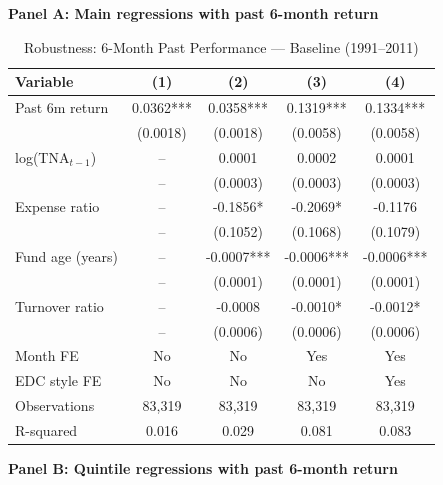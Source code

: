 \documentclass{article}
\begin{document}
\begin{table}[htbp]
\centering
\caption{Robustness: 6-Month Past Performance --- Baseline (1991--2011)}
\label{tab:robustness-6m}
\scriptsize
\begin{threeparttable}

\textbf{Panel A: Main regressions with past 6-month return}

\vspace{0.2cm}

\begin{tabular}{lcccc}
\toprule
Variable & (1) & (2) & (3) & (4) \\
\midrule
Past 6m return & 0.0362*** & 0.0358*** & 0.1319*** & 0.1334*** \\
 & (0.0018) & (0.0018) & (0.0058) & (0.0058) \\
log(TNA$_{t-1}$) & -- & 0.0001 & 0.0002 & 0.0001 \\
 & -- & (0.0003) & (0.0003) & (0.0003) \\
Expense ratio & -- & -0.1856* & -0.2069* & -0.1176 \\
 & -- & (0.1052) & (0.1068) & (0.1079) \\
Fund age (years) & -- & -0.0007*** & -0.0006*** & -0.0006*** \\
 & -- & (0.0001) & (0.0001) & (0.0001) \\
Turnover ratio & -- & -0.0008 & -0.0010* & -0.0012* \\
 & -- & (0.0006) & (0.0006) & (0.0006) \\
\midrule
Month FE & No & No & Yes & Yes \\
EDC style FE & No & No & No & Yes \\
Observations & 83,319 & 83,319 & 83,319 & 83,319 \\
R-squared & 0.016 & 0.029 & 0.081 & 0.083 \\
\bottomrule
\end{tabular}

\vspace{0.45cm}

\textbf{Panel B: Quintile regressions with past 6-month return}

\vspace{0.2cm}


\end{threeparttable}
\end{table}
\end{document}
